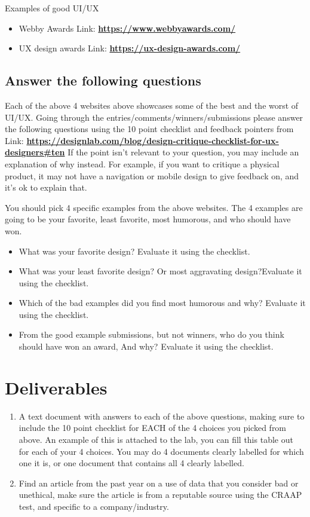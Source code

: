 \documentclass[12pt]{article}
\begin{document}
Examples of good UI/UX
\begin{itemize}
    \item Webby Awards Link: \href{https://www.webbyawards.com/}{\textbf{https://www.webbyawards.com/}}
    \item UX design awards Link: \href{https://ux-design-awards.com/}{\textbf{https://ux-design-awards.com/}}
\end{itemize}


\subsection*{Answer the following questions}
Each of the above 4 websites above showcases some of the best and the worst of UI/UX. Going through the entries/comments/winners/submissions please answer the following questions using the 10 point checklist and feedback pointers from Link: \href{https://designlab.com/blog/design-critique-checklist-for-ux-designers#ten}{\textbf{https://designlab.com/blog/design-critique-checklist-for-ux-designers#ten}} If the point isn't relevant to your question, you may include an explanation of why instead. For example, if you want to critique a physical product, it may not have a navigation or mobile design to give feedback on, and it's ok to explain that. 

You should pick 4 specific examples from the above websites.  The 4 examples are going to be your favorite, least favorite, most humorous, and who should have won.  

    \begin{itemize}
        \item What was your favorite design? Evaluate it using the checklist.
        \item What was your least favorite design? Or most aggravating design?Evaluate it using the checklist.
        \item Which of the bad examples did you find most humorous and why? Evaluate it using the checklist.
        \item From the good example submissions, but not winners, who do you think should have won an award, And why? Evaluate it using the checklist.
    \end{itemize}



\section*{Deliverables}
\begin{enumerate}
    \item A text document with answers to each of the above questions, making sure to include the 10 point checklist for EACH of the 4 choices you picked from above.  An example of this is attached to the lab, you can fill this table out for each of your 4 choices.  You may do 4 documents clearly labelled for which one it is, or one document that contains all 4 clearly labelled.
    \item Find an article from the past year on a use of data that you consider bad or unethical, make sure the article is from a reputable source using the CRAAP test, and specific to a company/industry.
\end{enumerate}
\end{document}
